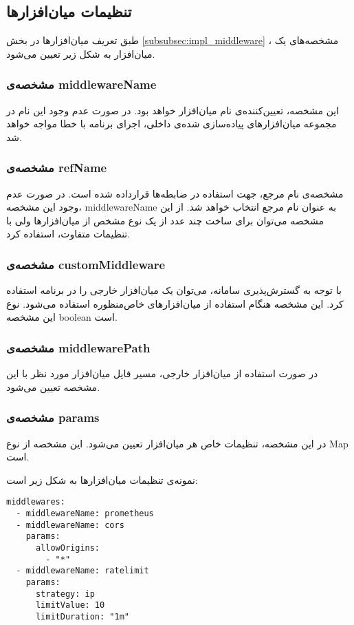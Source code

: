\subsection*{تنظیمات میان‌افزار‌ها}
طبق تعریف میان‌افزار‌ها در بخش
\ref{subsubsec:impl_middleware}
، مشخصه‌های یک میان‌افزار به شکل زیر تعیین می‌شود.


\subsubsection*{مشخصه‌ی middlewareName}
این مشخصه،‌ تعیین‌کننده‌ی نام میان‌افزار خواهد بود. در صورت عدم وجود این نام در مجموعه میان‌افزار‌های پیاده‌سازی شده‌ی داخلی، اجرای برنامه با خطا مواجه خواهد شد.

\subsubsection*{مشخصه‌ی refName}
مشخصه‌ی نام مرجع،‌ جهت استفاده در ضابطه‌ها قرار‌داده شده است. در صورت عدم وجود این مشخصه، middlewareName به عنوان نام مرجع انتخاب خواهد شد. از این مشخصه می‌توان برای ساخت چند عدد از یک نوع مشخص از میان‌افزار‌ها ولی با تنظیمات متفاوت، استفاده کرد.

\subsubsection*{مشخصه‌ی customMiddleware}
با توجه به گسترش‌پذیری سامانه، می‌توان یک میان‌افزار خارجی را در برنامه استفاده کرد. این مشخصه هنگام استفاده از میان‌افزار‌های خاص‌منظوره استفاده می‌شود. نوع این مشخصه boolean است.

\subsubsection*{مشخصه‌ی middlewarePath}
در صورت استفاده از میان‌افزار خارجی، مسیر فایل میان‌افزار مورد نظر با این مشخصه تعیین می‌شود.

\subsubsection*{مشخصه‌ی params}
در این مشخصه، تنظیمات خاص هر میان‌افزار تعیین می‌شود. این مشخصه از نوع Map است.

نمونه‌ی تنظیمات میان‌افزار‌ها به شکل زیر است:

\begin{latin}
  \begin{lstlisting}
middlewares:
  - middlewareName: prometheus
  - middlewareName: cors
    params:
      allowOrigins:
        - "*"
  - middlewareName: ratelimit
    params:
      strategy: ip
      limitValue: 10
      limitDuration: "1m"

  \end{lstlisting}
\end{latin}

